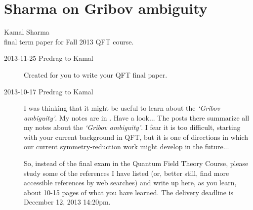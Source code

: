 
\section{Sharma on Gribov ambiguity}
\label{c-dailyBlogKS}

\noindent
Kamal Sharma\\final term paper for Fall 2013 QFT course.
\\

\begin{description}
\item[2013-11-25  Predrag to Kamal] Created  for
    you to write your QFT final paper.


\item[2013-10-17 Predrag to Kamal] I was thinking that it might be
    useful to learn about the \emph{`Gribov ambiguity'}. My notes are
    in . Have a look... The posts there summarize
    all my notes about the \emph{`Gribov ambiguity'}. I fear it is
    too difficult, starting with your current background in QFT, but
    it is one of directions in which our current symmetry-reduction
    work might develop in the future...

So, instead of the final exam in the Quantum Field Theory Course,
please study some of the references I have listed (or, better still,
find more accessible references by web searches) and write up here,
as you learn, about 10-15 pages of what you have learned. The
delivery deadline is  December 12, 2013 14:20pm.


\end{description}


